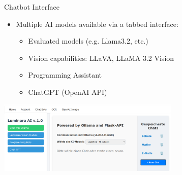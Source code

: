 \documentclass{beamer}
\begin{document}
\begin{frame}{Chatbot Interface}
  \begin{itemize}
    \item Multiple AI models available via a tabbed interface:
      \begin{itemize}
        \item Evaluated models (e.g. Llama3.2, etc.)
        \item Vision capabilities: LLaVA, LLaMA 3.2 Vision
        \item Programming Assistant
        \item ChatGPT (OpenAI API)
      \end{itemize}
  \end{itemize}
  \vspace{0.1cm}
  \centering
  \includegraphics[width=0.65\textwidth]{Chat-Bot-Navigation-Bar.png}
\end{frame}
\end{document}
